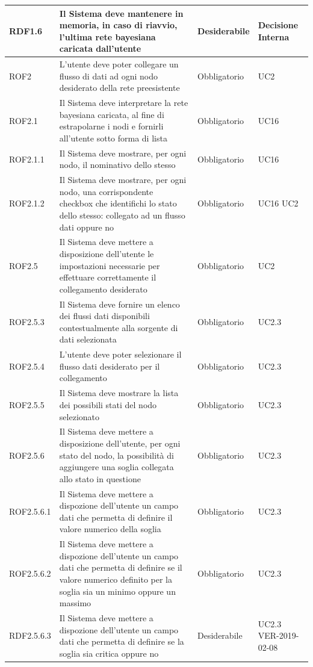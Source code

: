 \begin{center}
\begin{longtable}[c]{|m{}|m{}|m{}|m{}|}
\hline
RDF1.6 & Il Sistema deve mantenere in memoria, in caso di riavvio, l'ultima rete bayesiana caricata dall'utente & Desiderabile & Decisione Interna\\
\hline
\rowcolor{grigio}ROF2 & L'utente deve poter collegare un flusso di dati ad ogni nodo desiderato della rete preesistente & Obbligatorio & UC2\\
\hline
ROF2.1 & Il Sistema deve interpretare la rete bayesiana caricata, al fine di estrapolarne i nodi e fornirli all'utente sotto forma di lista & Obbligatorio & UC16\\
\hline
\rowcolor{grigio}ROF2.1.1 & Il Sistema deve mostrare, per ogni nodo, il nominativo dello stesso & Obbligatorio & UC16\\
\hline
ROF2.1.2 & Il Sistema deve mostrare, per ogni nodo, una corrispondente checkbox che identifichi lo stato dello stesso: collegato ad un flusso dati oppure no & Obbligatorio & UC16 UC2\\
\hline
\rowcolor{grigio}ROF2.5 & Il Sistema deve mettere a disposizione dell'utente le impostazioni necessarie per effettuare correttamente il collegamento desiderato & Obbligatorio & UC2\\
\hline
ROF2.5.3 & Il Sistema deve fornire un elenco dei flussi dati disponibili contestualmente alla sorgente di dati selezionata & Obbligatorio & UC2.3\\
\hline
\rowcolor{grigio}ROF2.5.4 & L'utente deve poter selezionare il flusso dati desiderato per il collegamento & Obbligatorio & UC2.3\\
\hline
ROF2.5.5 & Il Sistema deve mostrare la lista dei possibili stati del nodo selezionato & Obbligatorio & UC2.3\\
\hline
\rowcolor{grigio}ROF2.5.6 & Il Sistema deve mettere a disposizione dell'utente, per ogni stato del nodo, la possibilità di aggiungere una soglia collegata allo stato in questione & Obbligatorio & UC2.3\\
\hline
ROF2.5.6.1 & Il Sistema deve mettere a dispozione dell'utente un campo dati che permetta di definire il valore numerico della soglia & Obbligatorio & UC2.3\\
\hline
\rowcolor{grigio}ROF2.5.6.2 & Il Sistema deve mettere a dispozione dell'utente un campo dati che permetta di definire se il valore numerico definito per la soglia sia un minimo oppure un massimo & Obbligatorio & UC2.3\\
\hline
RDF2.5.6.3 & Il Sistema deve mettere a dispozione dell'utente un campo dati che permetta di definire se la soglia sia critica oppure no & Desiderabile & UC2.3 VER-2019-02-08\\

\end{longtable}
\end{center}
